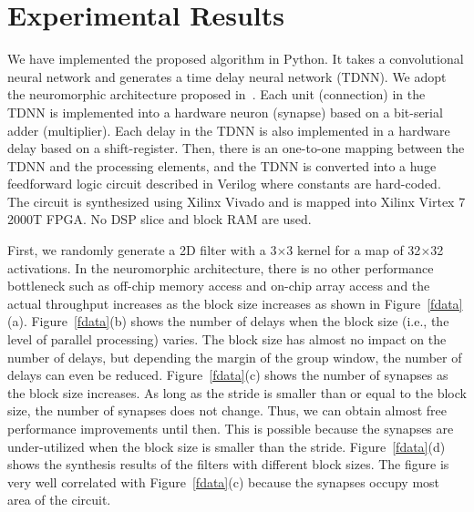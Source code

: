 \documentclass[journal]{IEEEtran}
\begin{document}
\section{Experimental Results}
  
  
We have implemented the proposed algorithm in Python. It takes a convolutional neural network and generates a time delay neural network (TDNN). We adopt the neuromorphic architecture proposed in~\cite{chung2015insight}. Each unit (connection) in the TDNN is implemented into a hardware neuron (synapse) based on a bit-serial adder (multiplier).  Each delay in the TDNN is also implemented in a hardware delay based on a shift-register. Then, there is an one-to-one mapping between the TDNN and the processing elements, and the TDNN is converted into a huge feedforward logic circuit described in Verilog where constants are hard-coded. The circuit is synthesized using Xilinx Vivado and is mapped into Xilinx Virtex 7 2000T FPGA. No DSP slice and block RAM are used.
  
  
First, we randomly generate a 2D filter with a 3$\times$3 kernel for a map of 32$\times$32 activations. 
In the neuromorphic architecture, there is no other performance bottleneck such as off-chip memory access and on-chip array access and the actual throughput increases as the block size increases as shown in Figure~\ref{fdata}(a).
Figure~\ref{fdata}(b) shows the number of delays when the block size (i.e., the level of parallel processing) varies. The block size has almost no impact on the number of delays, but depending the margin of the group window, the number of delays can even be reduced. Figure~\ref{fdata}(c) shows the number of synapses as the block size increases. As long as the stride is smaller than or equal to the block size, the number of synapses does not change. Thus, we can obtain almost free performance improvements until then. This is possible because the synapses are under-utilized when the block size is smaller than the stride. 
Figure~\ref{fdata}(d) shows the synthesis results of the filters with different block sizes. The figure is very well correlated with Figure~\ref{fdata}(c) because the synapses occupy most area of the circuit.
\end{document}
